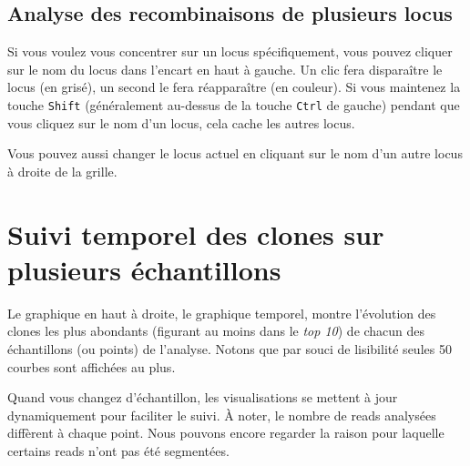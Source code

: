 \documentclass[10pt]{article}
\begin{document}
\subsection{Analyse des recombinaisons de plusieurs locus}

Si vous voulez vous concentrer sur un locus spécifiquement, vous pouvez
cliquer sur le nom du locus dans l'encart en haut à gauche. Un clic fera
disparaître le locus (en grisé), un second le fera réapparaître (en
couleur). Si vous maintenez la touche \texttt{Shift} (généralement au-dessus de
la touche \texttt{Ctrl} de gauche) pendant que vous cliquez sur le nom d'un
locus, cela cache les autres locus.


Vous pouvez aussi changer le locus actuel en cliquant sur le nom d'un
autre locus à droite de la grille.

\newpage

\section{Suivi temporel des clones sur plusieurs échantillons}
\label{sec:tracking}


Le graphique en haut à droite, le graphique temporel, montre l'évolution des
clones les plus abondants (figurant au moins dans le \textit{top 10}) de chacun des
échantillons (ou points) de l'analyse.
Notons que par souci de lisibilité seules 50 courbes sont affichées au plus.


Quand vous changez d'échantillon, les visualisations se mettent à jour
dynamiquement pour faciliter le suivi. À noter, le nombre de reads
analysées diffèrent à chaque point. Nous pouvons encore
regarder la raison pour laquelle certains reads n'ont pas été segmentées.
\end{document}
